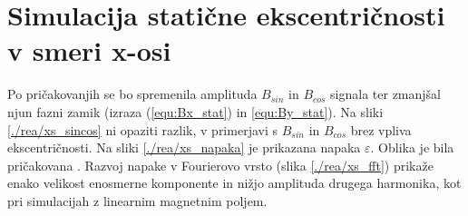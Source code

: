 \section{Simulacija statične ekscentričnosti v smeri x-osi}
Po pričakovanjih se bo spremenila amplituda $B_{sin}$ in $B_{cos}$ signala ter zmanjšal njun fazni zamik (izraza (\ref{equ:Bx_stat}) in \ref{equ:By_stat}). Na sliki \ref{./rea/xs_sincos} ni opaziti razlik, v primerjavi s $B_{sin}$ in $B_{cos}$ brez vpliva ekscentričnosti. Na sliki \ref{./rea/xs_napaka} je prikazana napaka $\varepsilon$. Oblika je bila pričakovana \cite{AM8192}. Razvoj napake v Fourierovo vrsto (slika \ref{./rea/xs_fft}) prikaže enako velikost enosmerne komponente in nižjo amplituda drugega harmonika, kot pri simulacijah z linearnim magnetnim poljem.
\newpage
